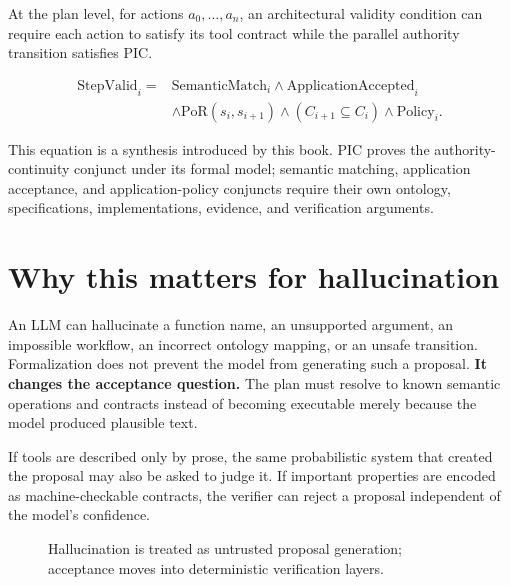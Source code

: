 \documentclass[10pt,oneside,openany]{book}
\begin{document}
At the plan level, for actions $a_0,\ldots,a_n$, an architectural validity condition can require each action to satisfy its tool contract while the parallel authority transition satisfies PIC.
\begin{formulabox}
\[
\begin{aligned}
\mathrm{StepValid}_i={}&\mathrm{SemanticMatch}_i
\land \mathrm{ApplicationAccepted}_i\\
&\land \mathrm{PoR}(s_i,s_{i+1})
\land (C_{i+1}\subseteq C_i)
\land \mathrm{Policy}_i.
\end{aligned}
\]
\end{formulabox}
This equation is a synthesis introduced by this book. PIC proves the authority-continuity conjunct under its formal model; semantic matching, application acceptance, and application-policy conjuncts require their own ontology, specifications, implementations, evidence, and verification arguments.

\section{Why this matters for hallucination}
An LLM can hallucinate a function name, an unsupported argument, an impossible workflow, an incorrect ontology mapping, or an unsafe transition. Formalization does not prevent the model from generating such a proposal. \textbf{It changes the acceptance question.} The plan must resolve to known semantic operations and contracts instead of becoming executable merely because the model produced plausible text.

If tools are described only by prose, the same probabilistic system that created the proposal may also be asked to judge it. If important properties are encoded as machine-checkable contracts, the verifier can reject a proposal independent of the model's confidence.

\begin{figure}[ht]
\centering
{}
\caption{Hallucination is treated as untrusted proposal generation; acceptance moves into deterministic verification layers.}
\end{figure}
\end{document}
